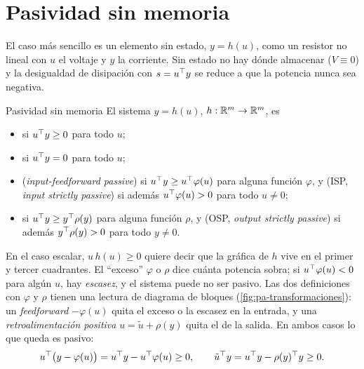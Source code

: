 \section{Pasividad sin memoria}
\label{sec:pa-sinmemoria}

El caso más sencillo es un elemento sin estado, $y=h(u)$, como un resistor no lineal con $u$ el voltaje y $y$ la corriente. Sin estado no hay dónde almacenar ($V\equiv0$) y la desigualdad de disipación con $s=u^{\top} y$ se reduce a que la potencia nunca sea negativa.

\begin{definicion}[label=def:pa-sinmemoria]{Pasividad sin memoria \citep[Def.~6.1]{Kha02}}
El sistema $y=h(u)$, $h:\mathbb{R}^m\to\mathbb{R}^m$, es
\begin{itemize}
  \item {} si $u^{\top} y\ge0$ para todo $u$;
  \item {} si $u^{\top} y=0$ para todo $u$;
  \item {} (\emph{input-feedforward passive}) si $u^{\top} y\ge u^{\top}\varphi(u)$ para alguna función $\varphi$, y  (ISP, \emph{input strictly passive}) si además $u^{\top}\varphi(u)>0$ para todo $u\neq0$;
  \item {} si $u^{\top} y\ge y^{\top}\rho(y)$ para alguna función $\rho$, y  (OSP, \emph{output strictly passive}) si además $y^{\top}\rho(y)>0$ para todo $y\neq0$.
\end{itemize}
\end{definicion}

En el caso escalar, $u\,h(u)\ge0$ quiere decir que la gráfica de $h$ vive en el primer y tercer cuadrantes. El ``exceso'' $\varphi$ o $\rho$ dice cuánta potencia sobra; si $u^{\top}\varphi(u)<0$ para algún $u$, hay \emph{escasez}, y el sistema puede no ser pasivo. Las dos definiciones con $\varphi$ y $\rho$ tienen una lectura de diagrama de bloques (\cref{fig:pa-transformaciones}): un \emph{feedforward} $-\varphi(u)$ quita el exceso o la escasez en la entrada, y una \emph{retroalimentación positiva} $u=\tilde u+\rho(y)$ quita el de la salida. En ambos casos lo que queda es pasivo:
\[
  u^{\top}\bigl(y-\varphi(u)\bigr)=u^{\top} y-u^{\top}\varphi(u)\ge0,
  \qquad
  \tilde u^{\top} y=u^{\top} y-\rho(y)^{\top} y\ge0 .
\]

